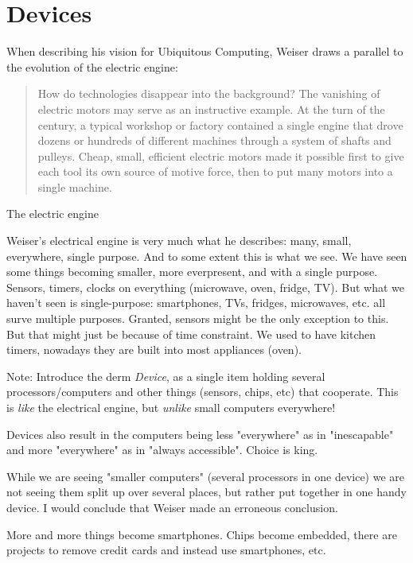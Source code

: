 \section{Devices}

When describing his vision for Ubiquitous Computing, Weiser draws a parallel to the evolution of the electric engine:

\begin{quote}
    How do technologies disappear into the background? The vanishing of electric motors may serve as an instructive example.
    At the turn of the century, a typical workshop or factory contained a single engine that drove dozens or hundreds of
    different machines through a system of shafts and pulleys. Cheap, small, efficient electric motors made it possible first
    to give each tool its own source of motive force, then to put many motors into a single machine.\cite{weiser91}
\end{quote}

The electric engine 

Weiser's electrical engine is very much what he describes: many, small, everywhere, single purpose. And to some extent
this is what we see. We have seen some things becoming smaller, more everpresent, and with a single purpose. Sensors, timers,
clocks on everything (microwave, oven, fridge, TV). But what we haven't seen is single-purpose: smartphones, TVs, fridges,
microwaves, etc. all surve multiple purposes. Granted, sensors might be the only exception to this. But that might just 
be because of time constraint. We used to have kitchen timers, nowadays they are built into most appliances (oven).

Note: Introduce the derm \emph{Device}, as a single item holding several processors/computers and other things (sensors, chips,
etc) that cooperate. This is \emph{like} the electrical engine, but \emph{unlike} small computers everywhere!

Devices also result in the computers being less "everywhere" as in "inescapable" and more "everywhere" as in "always accessible".
Choice is king.

While we are seeing "smaller computers" (several processors in one device) we are not seeing them split up over several places,
but rather put together in one handy device. I would conclude that Weiser made an erroneous conclusion.

More and more things become smartphones. Chips become embedded, there are projects to remove credit cards and instead use
smartphones, etc.


